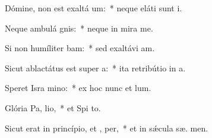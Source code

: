 \item Dómine, non est exaltá  um:~* neque eláti sunt  i.
\item Neque ambulá  gnis:~* neque in mira  me.
\item Si non humíliter bam:~* sed exaltávi  am.
\item Sicut ablactátus est super  a:~* ita retribútio in  a.
\item Speret Isra  mino:~* ex hoc nunc et   lum.
\item Glória Pa,  lio,~* et Spi to.
\item Sicut erat in princípio, et ,  per,~* et in sǽcula sæ. men.
